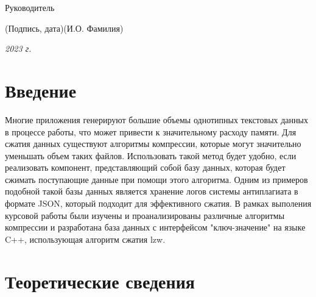 \documentclass[14pt, russian]{scrartcl}
\begin{document}
\begin{titlepage}
\bigskip

\noindent Руководитель  \hfill \underline{\hspace{4cm}}\quad
\underline{\hspace{4cm}}

\vspace{-2ex}
\noindent\hspace{13.5ex}\normalsize\hspace{170pt}\hspace{2ex}\scriptsize{(Подпись, дата)}\normalsize\hspace{30pt}\hspace{6ex}\scriptsize{(И.О. Фамилия)}\normalsize
\vfill

 


\begin{center}
\textsl{2023 г.}
\end{center}
\end{titlepage}


\setlength{\tabcolsep}{3pt}
\newpage
\setcounter{page}{2}

\newpage
\renewcommand\contentsname{\hfill{\normalfont{СОДЕРЖАНИЕ}}\hfill}  %
\tableofcontents
\newpage
\section{Введение} %
Многие приложения генерируют большие объемы однотипных текстовых данных в процессе работы, что может привести к значительному расходу памяти. Для сжатия данных существуют алгоритмы компрессии, которые могут значительно уменьшать объем таких файлов. Использовать такой метод будет удобно, если реализовать компонент, представляющий собой базу данных, которая будет сжимать поступающие данные при помощи этого алгоритма. Одним из примеров подобной такой базы данных является хранение логов системы антиплагиата в формате JSON, который подходит для эффективного сжатия. В рамках выполения курсовой работы были изучены и проанализированы различные алгоритмы компрессии и разработана база данных с интерфейсом "ключ-значение" на языке C++, использующая алгоритм сжатия lzw.

\section{Теоретические сведения}
\end{document}
